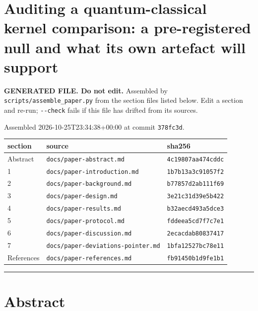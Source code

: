 \documentclass[
  10pt,
]{article}
\author{}
\date{}
\newcounter{none} %
\begin{document}
{
\setcounter{tocdepth}{3}
\tableofcontents
}
\section{Auditing a quantum-classical kernel comparison: a
pre-registered null and what its own artefact will
support}\label{auditing-a-quantum-classical-kernel-comparison-a-pre-registered-null-and-what-its-own-artefact-will-support}

\textbf{GENERATED FILE. Do not edit.} Assembled by
\texttt{scripts/\allowbreak{}assemble\_\allowbreak{}paper.py} from the section files listed below.
Edit a section and re-run; \texttt{-\/-check} fails if this file has
drifted from its sources.

Assembled 2026-10-25T23:34:38+00:00 at commit \texttt{378fc3d}.

{\def\LTcaptype{none} %
\begin{longtable}[]{@{}lll@{}}
\toprule\noalign{}
section & source & sha256 \\
\midrule\noalign{}
\endhead
\bottomrule\noalign{}
\endlastfoot
Abstract & \texttt{docs/\allowbreak{}paper-abstract.md} &
\texttt{4c19807aa474cddc} \\
1 & \texttt{docs/\allowbreak{}paper-introduction.md} & \texttt{1b7b13a3c91057f2} \\
2 & \texttt{docs/\allowbreak{}paper-background.md} & \texttt{b77857d2ab111f69} \\
3 & \texttt{docs/\allowbreak{}paper-design.md} & \texttt{3e21c31d39e5b422} \\
4 & \texttt{docs/\allowbreak{}paper-results.md} & \texttt{b32aecd493a5dce3} \\
5 & \texttt{docs/\allowbreak{}paper-protocol.md} & \texttt{fddeea5cd7f7c7e1} \\
6 & \texttt{docs/\allowbreak{}paper-discussion.md} & \texttt{2ecacdab80837417} \\
7 & \texttt{docs/\allowbreak{}paper-deviations-pointer.md} &
\texttt{1bfa12527bc78e11} \\
References & \texttt{docs/\allowbreak{}paper-references.md} &
\texttt{fb91450b1d9fe1b1} \\
\end{longtable}
}

\begin{center}\rule{0.5\linewidth}{0.5pt}\end{center}

\section{Abstract}\label{abstract}
\end{document}
